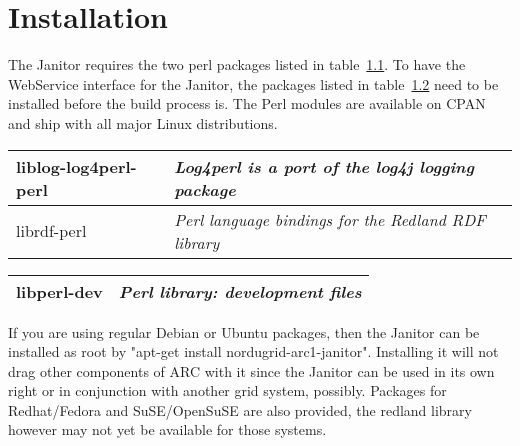 \chapter{Installation} 




The Janitor requires the two perl packages listed in
table~\ref{tab:install_dependencies}. To have the WebService
interface for the Janitor, the packages listed in
table~\ref{tab:install_dependencies_optional}
need to be installed before
the build process is. The Perl modules are available on CPAN and ship
with all major Linux distributions.  
\begin{table}[!h]
   \begin{center}
        \label{tab:install_dependencies}
	\begin{tabular}{|p{3cm}|p{7cm}|}
	\hline
	   liblog-log4perl-perl & \textit{Log4perl is a port of the log4j logging package}\\
	\hline
	   librdf-perl          & \textit{Perl language bindings for the Redland RDF library}\\
	\hline
	\end{tabular} 
   \end{center}
\end{table}
\begin{table}[!h]
   \begin{center}
        \label{tab:install_dependencies_optional}
	\begin{tabular}{|p{3cm}|p{7cm}|}
	\hline
	   libperl-dev & \textit{ Perl library: development files}\\
	\hline
	\end{tabular}
   \end{center}
\end{table}
\forcelinebreak

If you are using regular Debian or Ubuntu packages, then the Janitor
can be installed as root by "apt-get install nordugrid-arc1-janitor".
Installing it will not drag other components of ARC with it since the
Janitor can be used in its own right or in conjunction with another
grid system, possibly. Packages for Redhat/Fedora and SuSE/OpenSuSE are
also provided, the redland library however may not yet be available for
those systems.


